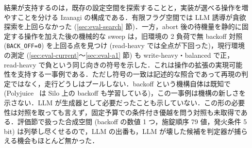 \documentclass[submit,techrep,noauthor]{ipsj}
\begin{document}
結果が支持するのは，既存の設定空間を探索することと，実装が選べる操作を増やすことを分ける Izanagi の構成である．有限フラグ空間では LLM 誘導が貪欲探索を上回らなかった (\ref{sec:eval-search} 節)．一方，abort 後の待機量を静的に固定する操作を加えた後の機械的な sweep は，旧環境の 2 負荷で無 backoff 対照 (\texttt{BACK\_OFF=0}) を上回る点を見つけ (read-heavy では全点が下回った)，現行環境の測定 (\ref{sec:eval-current}〜\ref{sec:eval-a1} 節) も write-heavy・balanced で正，read-heavy で負という同じ向きの符号を示した．これは操作の拡張の実現可能性を支持する一事例である．ただし符号の一致は記述的な照合であって再現の判定ではなく，走行どうしはプールしない．backoff という機構自体は既知で (Polyjuice~\cite{polyjuice} は Silo 上の backoff も学習している)，この一事例は機構の新しさを示さない．LLM が生成器として必要だったことも示していない．この形の必要性は対照を取っても言えず，固定予算での条件付き優越を問う対照も未取得である．評価節で扱った合成空間 (backoff の数値 1 つ，施錠順序 79 値，発火条件 5 bit) は列挙し尽くせるので，LLM の出番も，LLM が壊した候補を判定器が捕らえる機会もほとんど無かった．
\end{document}
